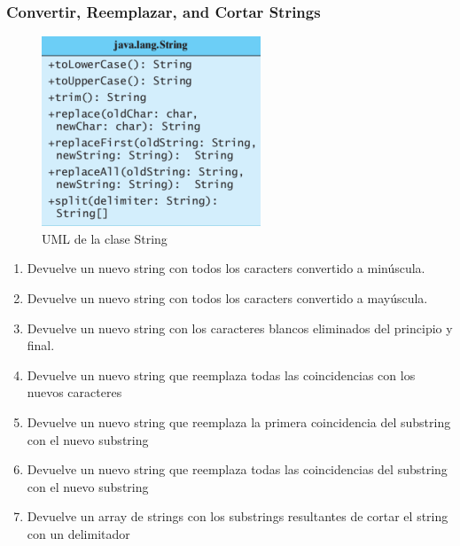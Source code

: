 \documentclass{beamer}
\begin{document}
\begin{frame}
\frametitle{Convertir, Reemplazar, and Cortar Strings} 
\begin{multicols}{2}
\begin{figure}
\includegraphics[scale=0.55]{imagenes/split.png} 
\caption{UML de la clase String}
\end{figure} 
\begin{scriptsize}
\begin{enumerate}[<+-| alert@+>]
      \item Devuelve un nuevo string con todos los caracters convertido a minúscula.
      \item Devuelve un nuevo string con todos los caracters convertido a mayúscula.
      \item Devuelve un nuevo string con los caracteres blancos eliminados del principio y final.
     \item Devuelve un nuevo string que reemplaza todas las coincidencias con los nuevos caracteres
      \item Devuelve un nuevo string que reemplaza la primera coincidencia del substring  con el nuevo substring
      \item Devuelve un nuevo string que reemplaza todas las coincidencias del substring  con el nuevo substring
      \item Devuelve un array de strings con los substrings resultantes de cortar el string con un delimitador
            \end{enumerate}
\end{scriptsize}
\end{multicols}
\pause
\end{frame}
\end{document}
